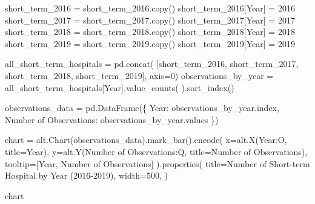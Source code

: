 \documentclass[
  letterpaper,
  DIV=11,
  numbers=noendperiod]{scrartcl}
\newenvironment{Shaded}{\begin{snugshade}}{\end{snugshade}}
\newcommand{\DecValTok}[1]{\textcolor[rgb]{0.68,0.00,0.00}{#1}}
\newcommand{\NormalTok}[1]{\textcolor[rgb]{0.00,0.23,0.31}{#1}}
\newcommand{\OperatorTok}[1]{\textcolor[rgb]{0.37,0.37,0.37}{#1}}
\newcommand{\StringTok}[1]{\textcolor[rgb]{0.13,0.47,0.30}{#1}}
\begin{document}
\begin{Shaded}
\begin{Highlighting}[]
\NormalTok{short\_term\_2016 }\OperatorTok{=}\NormalTok{ short\_term\_2016.copy()}
\NormalTok{short\_term\_2016[}\StringTok{\textquotesingle{}Year\textquotesingle{}}\NormalTok{] }\OperatorTok{=} \DecValTok{2016}
\NormalTok{short\_term\_2017 }\OperatorTok{=}\NormalTok{ short\_term\_2017.copy()}
\NormalTok{short\_term\_2017[}\StringTok{\textquotesingle{}Year\textquotesingle{}}\NormalTok{] }\OperatorTok{=} \DecValTok{2017}
\NormalTok{short\_term\_2018 }\OperatorTok{=}\NormalTok{ short\_term\_2018.copy()}
\NormalTok{short\_term\_2018[}\StringTok{\textquotesingle{}Year\textquotesingle{}}\NormalTok{] }\OperatorTok{=} \DecValTok{2018}
\NormalTok{short\_term\_2019 }\OperatorTok{=}\NormalTok{ short\_term\_2019.copy()}
\NormalTok{short\_term\_2019[}\StringTok{\textquotesingle{}Year\textquotesingle{}}\NormalTok{] }\OperatorTok{=} \DecValTok{2019}

\NormalTok{all\_short\_term\_hospitals }\OperatorTok{=}\NormalTok{ pd.concat(}
\NormalTok{    [short\_term\_2016, short\_term\_2017, short\_term\_2018, short\_term\_2019], axis}\OperatorTok{=}\DecValTok{0}\NormalTok{)}
\NormalTok{observations\_by\_year }\OperatorTok{=}\NormalTok{ all\_short\_term\_hospitals[}\StringTok{\textquotesingle{}Year\textquotesingle{}}\NormalTok{].value\_counts(}
\NormalTok{).sort\_index()}

\NormalTok{observations\_data }\OperatorTok{=}\NormalTok{ pd.DataFrame(\{}
    \StringTok{\textquotesingle{}Year\textquotesingle{}}\NormalTok{: observations\_by\_year.index,}
    \StringTok{\textquotesingle{}Number of Observations\textquotesingle{}}\NormalTok{: observations\_by\_year.values}
\NormalTok{\})}

\NormalTok{chart }\OperatorTok{=}\NormalTok{ alt.Chart(observations\_data).mark\_bar().encode(}
\NormalTok{    x}\OperatorTok{=}\NormalTok{alt.X(}\StringTok{\textquotesingle{}Year:O\textquotesingle{}}\NormalTok{, title}\OperatorTok{=}\StringTok{\textquotesingle{}Year\textquotesingle{}}\NormalTok{),}
\NormalTok{    y}\OperatorTok{=}\NormalTok{alt.Y(}\StringTok{\textquotesingle{}Number of Observations:Q\textquotesingle{}}\NormalTok{, title}\OperatorTok{=}\StringTok{\textquotesingle{}Number of Observations\textquotesingle{}}\NormalTok{),}
\NormalTok{    tooltip}\OperatorTok{=}\NormalTok{[}\StringTok{\textquotesingle{}Year\textquotesingle{}}\NormalTok{, }\StringTok{\textquotesingle{}Number of Observations\textquotesingle{}}\NormalTok{]}
\NormalTok{).properties(}
\NormalTok{    title}\OperatorTok{=}\StringTok{\textquotesingle{}Number of Short{-}term Hospital by Year (2016{-}2019)\textquotesingle{}}\NormalTok{,}
\NormalTok{    width}\OperatorTok{=}\DecValTok{500}\NormalTok{,}
\NormalTok{)}

\NormalTok{chart}
\end{Highlighting}
\end{Shaded}
\end{document}
